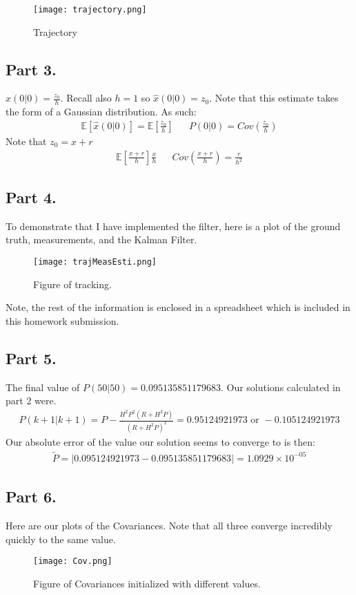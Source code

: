 \documentclass{article}
\begin{document}
\begin{figure}[hbt!]
\centering
\texttt{[image: trajectory.png]}
\caption{Trajectory}
\end{figure}

\clearpage
\subsection*{Part 3.}
$\hat{x}(0|0) = \frac{z_0}{h}$. Recall also $h=1$ so $\hat{x}(0|0) = z_0$. Note that this estimate takes the form of a Gaussian distribution. As such:
\begin{align*}
\mathbb{E}[\hat{x}(0|0)] = \mathbb{E}[\frac{z_0}{h}] && P(0|0) = Cov(\frac{z_0}{h})
\end{align*}
Note that $z_0= x + r$
\begin{align*}
\boxed{ \mathbb{E}[\frac{x+r}{h}] \frac{x}{h} } && \boxed{ Cov(\frac{x+r}{h}) = \frac{r}{h^2} }
\end{align*}

\clearpage
\subsection*{Part 4.}
To demonstrate that I have implemented the filter, here is a plot of the ground truth, measurements, and the Kalman Filter.

\begin{figure}[hbt!]
\centering
\texttt{[image: trajMeasEsti.png]}
\caption{Figure of tracking.}
\end{figure}

Note, the rest of the information is enclosed in a spreadsheet which is included in this homework submission.

\clearpage
\subsection*{Part 5.}
The final value of $P(50|50)=0.095135851179683$. Our solutions calculated in part 2 were.
\begin{align*}
P(k+1|k+1) = P - \frac{H^2 P^2 (R+ H^2 P)}{(R+H^2P)^2} = 0.95124921973 \text{ or } -0.105124921973
\end{align*}
Our absolute error of the value our solution seems to converge to is then:
\begin{align*}
\boxed{ \tilde{P} = |0.095124921973-0.095135851179683| = 1.0929 \times 10^{-05 } }
\end{align*}

\clearpage
\subsection*{Part 6.}
Here are our plots of the Covariances. Note that all three converge incredibly quickly to the same value.

\begin{figure}[hbt!]
\centering
\texttt{[image: Cov.png]}
\caption{Figure of Covariances initialized with different values.}
\end{figure}
\end{document}
